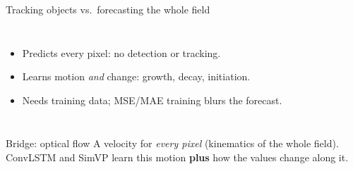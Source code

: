 \begin{frame}{Tracking objects vs.\ forecasting the whole field}
\begin{columns}[t]
        \vspace{0.02cm}
        \raggedright
        \scriptsize
        \begin{itemize}
            \item Predicts \alert{every pixel}: no detection or tracking.
            \item Learns motion \emph{and} change: growth, decay, initiation.
            \item Needs training data; MSE/MAE training blurs the forecast.
        \end{itemize}
    \end{columns}

    \vspace{-0.1cm}
    \begin{block}{Bridge: optical flow}
        \scriptsize A velocity for \emph{every pixel} (kinematics of the whole field). ConvLSTM and SimVP learn this motion \textbf{plus} how the values change along it.
    \end{block}
\end{frame}
